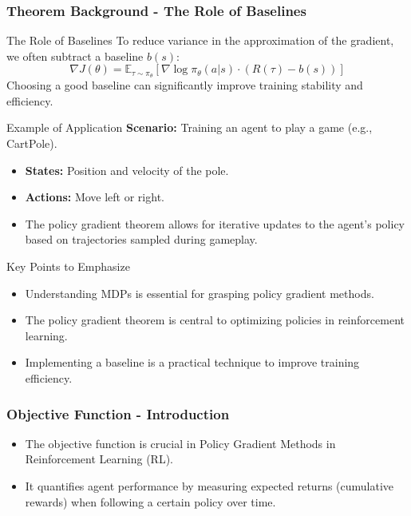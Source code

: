 \documentclass[aspectratio=169]{beamer}
\begin{document}
\begin{frame}[fragile]
    \frametitle{Theorem Background - The Role of Baselines}
    \begin{block}{The Role of Baselines}
        To reduce variance in the approximation of the gradient, we often subtract a baseline $b(s)$:
        \begin{equation}
        \nabla J(\theta) = \mathbb{E}_{\tau \sim \pi_\theta} \left[ \nabla \log \pi_\theta(a | s) \cdot (R(\tau) - b(s)) \right]
        \end{equation}
        Choosing a good baseline can significantly improve training stability and efficiency.
    \end{block}

    \begin{block}{Example of Application}
        \textbf{Scenario:} Training an agent to play a game (e.g., CartPole).
        \begin{itemize}
            \item \textbf{States:} Position and velocity of the pole.
            \item \textbf{Actions:} Move left or right.
            \item The policy gradient theorem allows for iterative updates to the agent's policy based on trajectories sampled during gameplay.
        \end{itemize}
    \end{block}
    
    \begin{block}{Key Points to Emphasize}
        \begin{itemize}
            \item Understanding MDPs is essential for grasping policy gradient methods.
            \item The policy gradient theorem is central to optimizing policies in reinforcement learning.
            \item Implementing a baseline is a practical technique to improve training efficiency.
        \end{itemize}
    \end{block}
\end{frame}

\begin{frame}[fragile]
  \frametitle{Objective Function - Introduction}
  \begin{itemize}
    \item The objective function is crucial in Policy Gradient Methods in Reinforcement Learning (RL).
    \item It quantifies agent performance by measuring expected returns (cumulative rewards) when following a certain policy over time.
  \end{itemize}
\end{frame}
\end{document}
